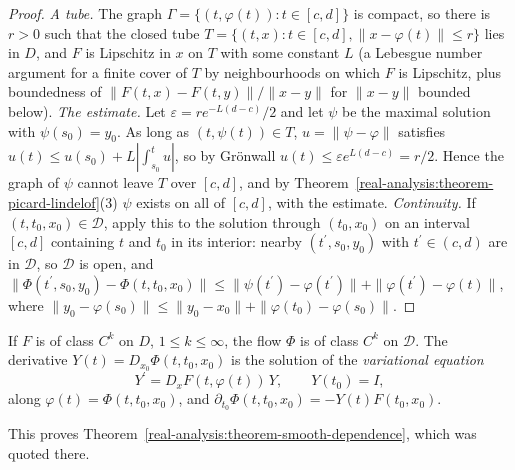 \begin{proof}
\emph{A tube.} The graph $\Gamma = \{(t, \varphi(t)) : t \in [c, d]\}$ is compact, so there is $r > 0$ such that the closed tube $T = \{(t, x) : t \in [c, d], \|x - \varphi(t)\| \leq r\}$ lies in $D$, and $F$ is Lipschitz in $x$ on $T$
with some constant $L$ (a Lebesgue number argument for a finite cover of $T$ by neighbourhoods on which $F$ is Lipschitz, plus boundedness of $\|F(t, x) - F(t, y)\|/\|x - y\|$ for $\|x - y\|$ bounded below). \emph{The estimate.} Let
$\varepsilon = re^{-L(d - c)}/2$ and let $\psi$ be the maximal solution with $\psi(s_0) = y_0$. As long as $(t, \psi(t)) \in T$, $u = \|\psi - \varphi\|$ satisfies $u(t) \leq u(s_0) + L|\int_{s_0}^tu|$, so by Gr\"onwall
$u(t) \leq \varepsilon e^{L(d - c)} = r/2$. Hence the graph of $\psi$ cannot leave $T$ over $[c, d]$, and by Theorem~\ref{real-analysis:theorem-picard-lindelof}(3) $\psi$ exists on all of $[c, d]$, with the estimate.
\emph{Continuity.} If $(t, t_0, x_0) \in \mathcal{D}$, apply this to the solution through $(t_0, x_0)$ on an interval $[c, d]$ containing $t$ and $t_0$ in its interior: nearby $(t^{\prime}, s_0, y_0)$ with $t^{\prime} \in (c, d)$ are in
$\mathcal{D}$, so $\mathcal{D}$ is open, and $\|\Phi(t^{\prime}, s_0, y_0) - \Phi(t, t_0, x_0)\| \leq \|\psi(t^{\prime}) - \varphi(t^{\prime})\| + \|\varphi(t^{\prime}) - \varphi(t)\|$, where $\|y_0 - \varphi(s_0)\| \leq \|y_0 - x_0\| + \|\varphi(t_0) - \varphi(s_0)\|$.
\end{proof}

\begin{theorem}\label{ordinary-differential-equations:theorem-differentiable-dependence}
If $F$ is of class $C^k$ on $D$, $1 \leq k \leq \infty$, the flow $\Phi$ is of class $C^k$ on $\mathcal{D}$. The derivative $Y(t) = D_{x_0}\Phi(t, t_0, x_0)$ is the solution of the \emph{variational equation}
\[
Y^{\prime} = D_xF(t, \varphi(t))\,Y, \qquad Y(t_0) = I,
\]
along $\varphi(t) = \Phi(t, t_0, x_0)$, and $\partial_{t_0}\Phi(t, t_0, x_0) = -Y(t)F(t_0, x_0)$.
\end{theorem}

This proves Theorem~\ref{real-analysis:theorem-smooth-dependence}, which was quoted there.

